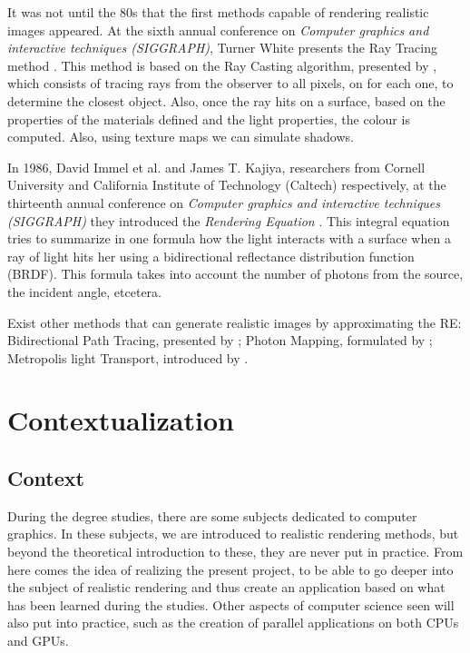 \documentclass[titlepage,12pt]{report}
\begin{document}
It was not until the 80s that the first methods capable of rendering realistic images appeared. At the sixth annual conference on \textit{Computer graphics and interactive techniques (SIGGRAPH)}, Turner White presents the Ray Tracing method \citep[pp.~343--349]{Whitted1980}. This method is based on the Ray Casting algorithm, presented by \citep[pp.~37--45]{Appel1968}, which consists of tracing rays from the observer to all pixels, on for each one, to determine the closest object. Also, once the ray hits on a surface, based on the properties of the materials defined and the light properties, the colour is computed. Also, using texture maps we can simulate shadows.

In 1986, David Immel et al. and James T. Kajiya, researchers from Cornell University and California Institute of Technology (Caltech) respectively, at the thirteenth annual conference on \textit{Computer graphics and interactive techniques (SIGGRAPH)} they introduced the \textit{Rendering Equation} \citep[pp.~143--150, pp.~133--142]{Kajiya1986, Immel1986}. This integral equation tries to summarize in one formula how the light interacts with a surface when a ray of light hits her using a bidirectional reflectance distribution function (BRDF). This formula takes into account the number of photons from the source, the incident angle, etcetera.

Exist other methods that can generate realistic images by approximating the RE: Bidirectional Path Tracing, presented by \citep[pp.~145--153]{Lafortune1993}; Photon Mapping, formulated by \citep[pp. ~21--30]{Jensen1996}; Metropolis light Transport, introduced by \citep[pp. ~65--76]{Veach1997}.

\newpage

\section{Contextualization}

\subsection{Context}

During the degree studies, there are some subjects dedicated to computer graphics. In these subjects, we are introduced to realistic rendering methods, but beyond the theoretical introduction to these, they are never put in practice. From here comes the idea of realizing the present project, to be able to go deeper into the subject of realistic rendering and thus create an application based on what has been learned during the studies. Other aspects of computer science seen will also put into practice, such as the creation of parallel applications on both CPUs and GPUs.
\end{document}
